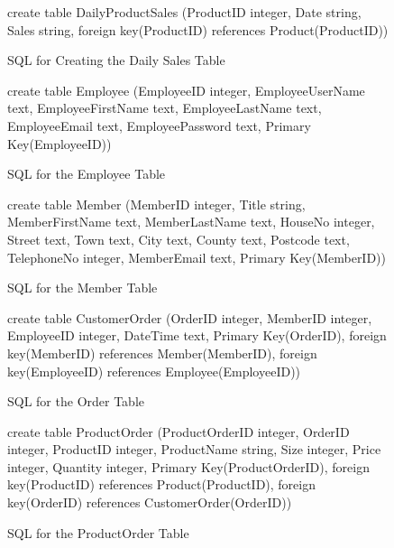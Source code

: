 \begin{figure}[H]
	 \caption{SQL for Creating the Daily Sales Table} \label{fig:daily-sql}
	\begin{sql}
	create table DailyProductSales
          (ProductID integer,
          Date string,
          Sales string,
          foreign key(ProductID) references Product(ProductID))
	\end{sql}
\end{figure}

\begin{figure}[H]
	 \caption{SQL for the Employee Table} \label{fig:employee-sql}
	\begin{sql}
	create table Employee
              (EmployeeID integer,
              EmployeeUserName text,
              EmployeeFirstName text,
              EmployeeLastName text,
              EmployeeEmail text,
              EmployeePassword text,
              Primary Key(EmployeeID))
	\end{sql}
\end{figure}

\begin{figure}[H]
	 \caption{SQL for the Member Table} \label{fig:member-sql}
	\begin{sql}
	create table Member
              (MemberID integer,
              Title string,
              MemberFirstName text,
              MemberLastName text,
              HouseNo integer,
              Street text,
              Town text,
              City text,
              County text,
              Postcode text,
              TelephoneNo integer,
              MemberEmail text,
              Primary Key(MemberID))
	\end{sql}
\end{figure}

\begin{figure}[H]
	 \caption{SQL for the Order Table} \label{fig:order-sql}
	\begin{sql}
	create table CustomerOrder
            (OrderID integer,
            MemberID integer,
            EmployeeID integer,
            DateTime text,
            Primary Key(OrderID),
            foreign key(MemberID) references Member(MemberID),
            foreign key(EmployeeID) references Employee(EmployeeID))
	\end{sql}
\end{figure}

\begin{figure}[H]
	 \caption{SQL for the ProductOrder Table} \label{fig:product-order-sql}
	\begin{sql}
	create table ProductOrder
            (ProductOrderID integer,
            OrderID integer,
            ProductID integer,
            ProductName string,
            Size integer,
            Price integer,
            Quantity integer,
            Primary Key(ProductOrderID),
            foreign key(ProductID) references Product(ProductID),
            foreign key(OrderID) references CustomerOrder(OrderID))
	\end{sql}
\end{figure}

